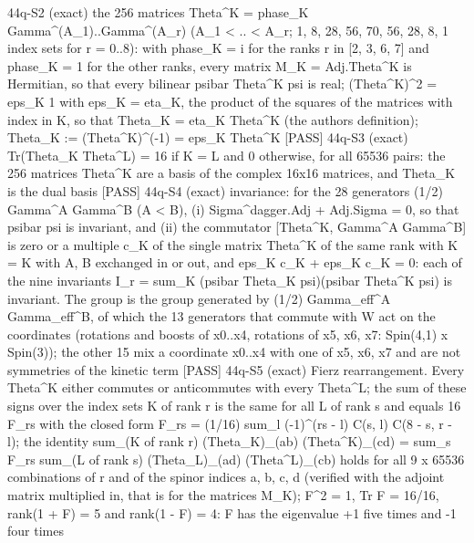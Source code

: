 \documentclass[
  10pt,
]{article}
\newenvironment{Shaded}{}{}
\newcommand{\NormalTok}[1]{#1}
\begin{document}
\begin{Shaded}
\begin{Highlighting}[]
\NormalTok{[PASS] 44q{-}S2  (exact) the 256 matrices Theta\^{}K = phase\_K Gamma\^{}(A\_1)..Gamma\^{}(A\_r) (A\_1 \textless{} .. \textless{} A\_r; 1, 8, 28, 56, 70, 56, 28, 8, 1 index sets for r = 0..8): with phase\_K = i for the ranks r in [2, 3, 6, 7] and phase\_K = 1 for the other ranks, every matrix M\_K = Adj.Theta\^{}K is Hermitian, so that every bilinear psibar Theta\^{}K psi is real; (Theta\^{}K)\^{}2 = eps\_K 1 with eps\_K = eta\_K, the product of the squares of the matrices with index in K, so that Theta\_K = eta\_K Theta\^{}K (the author\textquotesingle{}s definition); Theta\_K := (Theta\^{}K)\^{}({-}1) = eps\_K Theta\^{}K}
\NormalTok{[PASS] 44q{-}S3  (exact) Tr(Theta\_K Theta\^{}L) = 16 if K = L and 0 otherwise, for all 65536 pairs: the 256 matrices Theta\^{}K are a basis of the complex 16x16 matrices, and Theta\_K is the dual basis}
\NormalTok{[PASS] 44q{-}S4  (exact) invariance: for the 28 generators (1/2) Gamma\^{}A Gamma\^{}B (A \textless{} B), (i) Sigma\^{}dagger.Adj + Adj.Sigma = 0, so that psibar psi is invariant, and (ii) the commutator [Theta\^{}K, Gamma\^{}A Gamma\^{}B] is zero or a multiple c\_K of the single matrix Theta\^{}K\textquotesingle{} of the same rank with K\textquotesingle{} = K with A, B exchanged in or out, and eps\_K c\_K + eps\_K\textquotesingle{} c\_K\textquotesingle{} = 0: each of the nine invariants I\_r = sum\_K (psibar Theta\_K psi)(psibar Theta\^{}K psi) is invariant. The group is the group generated by (1/2) Gamma\_eff\^{}A Gamma\_eff\^{}B, of which the 13 generators that commute with W act on the coordinates (rotations and boosts of x0..x4, rotations of x5, x6, x7: Spin(4,1) x Spin(3)); the other 15 mix a coordinate x0..x4 with one of x5, x6, x7 and are not symmetries of the kinetic term}
\NormalTok{[PASS] 44q{-}S5  (exact) Fierz rearrangement. Every Theta\^{}K either commutes or anticommutes with every Theta\^{}L; the sum of these signs over the index sets K of rank r is the same for all L of rank s and equals 16 F\_rs with the closed form F\_rs = (1/16) sum\_l ({-}1)\^{}(rs {-} l) C(s, l) C(8 {-} s, r {-} l); the identity sum\_(K of rank r) (Theta\_K)\_(ab) (Theta\^{}K)\_(cd) = sum\_s F\_rs sum\_(L of rank s) (Theta\_L)\_(ad) (Theta\^{}L)\_(cb) holds for all 9 x 65536 combinations of r and of the spinor indices a, b, c, d (verified with the adjoint matrix multiplied in, that is for the matrices M\_K); F\^{}2 = 1, Tr F = 16/16, rank(1 + F) = 5 and rank(1 {-} F) = 4: F has the eigenvalue +1 five times and {-}1 four times}

\end{Highlighting}
\end{Shaded}
\end{document}
